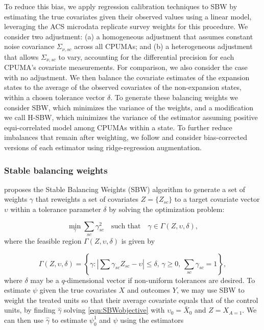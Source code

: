 \documentclass[aoas]{imsart}
\theoremstyle{plain}
\theoremstyle{remark}
\begin{document}
To reduce this bias, we apply regression calibration techniques to SBW by estimating the true covariates given their observed values using a linear model, leveraging the ACS microdata replicate survey weights for this procedure. We consider two adjustment: (a) a homogeneous adjustment that assumes constant noise covariance $\Sigma_{\nu, sc}$ across all CPUMAs; and (b) a heterogeneous adjustment that allows $\Sigma_{\nu,sc}$ to vary, accounting for the differential precision for each CPUMA's covariate measurements. For comparison, we also consider the case with no adjustment. We then balance the covariate estimates of the expansion states to the average of the observed covariates of the non-expansion states, within a chosen tolerance vector $\delta$. To generate these balancing weights we consider SBW, which minimizes the variance of the weights, and a modification we call H-SBW, which minimizes the variance of the estimator assuming positive equi-correlated model among CPUMAs within a state. To further reduce imbalances that remain after weighting, we follow \cite{ben2021augmented} and consider bias-corrected versions of each estimator using ridge-regression augmentation. 

\subsubsection{Stable balancing weights}\label{ssec:SBW}

\cite{zubizarreta2015stable} proposes the Stable Balancing Weights (SBW) algorithm to generate a set of weights $\gamma$ that reweights a set of covariates $Z = \{Z_{sc}\}$ to a target covariate vector $\upsilon$ within a tolerance parameter $\delta$ by solving the optimization problem:

\begin{equation}\label{eqn:SBWobjective}
 \min_{\gamma} \sum_{sc} \gamma_{sc}^2 \quad \text{such that} \quad \gamma \in \Gamma(Z, \upsilon, \delta),
\end{equation}
%
where the feasible region $\Gamma(Z, \upsilon, \delta)$ is given by

\[ \Gamma(Z, \upsilon, \delta) = \left\{\gamma: \left|\sum \gamma_{sc} Z_{sc}  - \upsilon\right| \leq \delta,\, \gamma \geq 0,\, \sum_{sc} \gamma_{sc} = 1\right\},\]
%
where $\delta$ may be a $q$-dimensional vector if non-uniform tolerances are desired. To estimate $\psi$ given the true covariates $X$ and outcomes $Y$, we may use SBW to weight the treated units so that their average covariate equals that of the control units, by finding $\hat{\gamma}$ solving \eqref{eqn:SBWobjective} with $\upsilon_0 = \bar{X}_0$ and $Z = X_{A=1}$. We can then use $\hat{\gamma}$ to estimate $\psi_0^1$ and $\psi$ using the estimators
\end{document}
